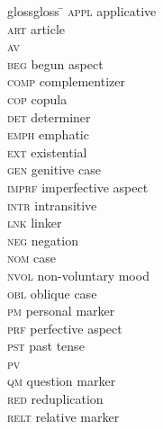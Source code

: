 \documentclass[output=paper]{langsci/langscibook}
\begin{document}
\begin{multicols}{2}
	\begin{tabbing}
		glossgloss \= \kill
		\textsc{appl} \> applicative\\
		\textsc{art} \> article\\
		\textsc{av} \> \\
		\textsc{beg} \> begun aspect\\
		\textsc{comp} \> complementizer\\
		\textsc{cop} \> copula\\
		\textsc{det} \> determiner\\
		\textsc{emph} \> emphatic\\
		\textsc{ext} \> existential\\
		\textsc{gen} \> genitive case\\
		\textsc{imprf} \> imperfective aspect\\
		\textsc{intr} \> intransitive\\
		\textsc{lnk} \> linker\\
		\textsc{neg} \> negation\\
		\textsc{nom} \>  case\\
		\textsc{nvol} \> non-voluntary mood\\
		\textsc{obl} \> oblique case\\
		\textsc{pm} \> personal marker\\
		\textsc{prf} \> perfective aspect\\
		\textsc{pst} \> past tense\\
		\textsc{pv} \> \\
		\textsc{qm} \> question marker\\
		\textsc{red} \> reduplication\\
		\textsc{relt} \> relative marker
	\end{tabbing}
\end{multicols}

\sloppy
\printbibliography[heading=subbibliography,notkeyword=this]
\end{document}
